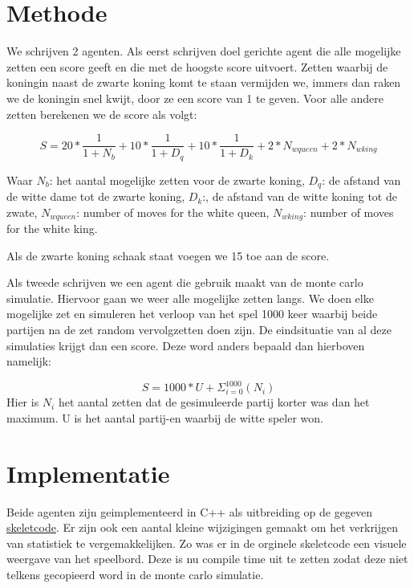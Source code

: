 \documentclass[10pt]{article}
\begin{document}
\section{Methode}

We schrijven 2 agenten. Als eerst schrijven doel gerichte agent die alle mogelijke zetten een score geeft en die met de hoogste score uitvoert. Zetten waarbij de koningin naast de zwarte koning komt te staan vermijden we, immers dan raken we de koningin snel kwijt, door ze een score van 1 te geven. Voor alle andere zetten berekenen we de score als volgt:

\begin{equation}
  S = 20*\frac{1}{1+N_b}
      + 10*\frac{1}{1+D_q}
      + 10*\frac{1}{1+D_k}
      + 2*N_{w queen}
      + 2*N_{w king}
\end{equation}

Waar $N_b$: het aantal mogelijke zetten voor de zwarte koning, $D_q$: de afstand van de witte dame tot de zwarte koning, $D_k$:, de afstand van de witte koning tot de zwate, $N_{w queen}$: number of moves for the white queen, $N_{w king}$: number of moves for the white king.

Als de zwarte koning schaak staat voegen we 15 toe aan de score.

Als tweede schrijven we een agent die gebruik maakt van de monte carlo simulatie. Hiervoor gaan we weer alle mogelijke zetten langs. We doen elke mogelijke zet en simuleren het verloop van het spel 1000 keer waarbij beide partijen na de zet random vervolgzetten doen zijn. De eindsituatie van al deze simulaties krijgt dan een score. Deze word anders bepaald dan hierboven namelijk:

\begin{equation}
  S = 1000*U + \Sigma_{i=0}^{1000} (N_{i})
\end{equation}
Hier is $N_i$ het aantal zetten dat de gesimuleerde partij korter was dan het maximum. U is het aantal partij-en waarbij de witte speler won.

\section{Implementatie}
Beide agenten zijn geimplementeerd in C++ als uitbreiding op de gegeven \href{http://liacs.leidenuniv.nl/~kosterswa/AI/chess.cc}{\underline{skeletcode}}. Er zijn ook een aantal kleine wijzigingen gemaakt om het verkrijgen van statistiek te vergemakkelijken. Zo was er in de orginele skeletcode een visuele weergave van het speelbord. Deze is nu compile time uit te zetten zodat deze niet telkens gecopieerd word in de monte carlo simulatie.
\end{document}

